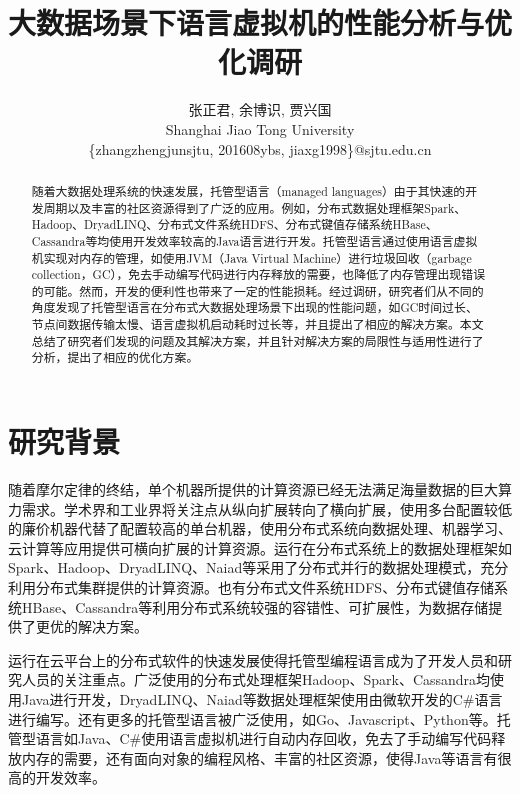 \documentclass[lang=cn,12pt,a4paper,cite=authoryear]{elegantpaper}
\title{大数据场景下语言虚拟机的性能分析与优化调研}
\author{张正君, 余博识, 贾兴国 \\ Shanghai Jiao Tong University \\ \{zhangzhengjunsjtu, 201608ybs, jiaxg1998\}@sjtu.edu.cn}
\institute{\href{http://www.se.sjtu.edu.cn/}{School of Software Engineering}}
\date{\zhtoday}
\begin{document}
\maketitle

\begin{abstract}
随着大数据处理系统的快速发展，托管型语言（managed languages）由于其快速的开发周期以及丰富的社区资源得到了广泛的应用。例如，分布式数据处理框架Spark、Hadoop、DryadLINQ、分布式文件系统HDFS、分布式键值存储系统HBase、Cassandra等均使用开发效率较高的Java语言进行开发。托管型语言通过使用语言虚拟机实现对内存的管理，如使用JVM（Java Virtual Machine）进行垃圾回收（garbage collection，GC），免去手动编写代码进行内存释放的需要，也降低了内存管理出现错误的可能。然而，开发的便利性也带来了一定的性能损耗。经过调研，研究者们从不同的角度发现了托管型语言在分布式大数据处理场景下出现的性能问题，如GC时间过长、节点间数据传输太慢、语言虚拟机启动耗时过长等，并且提出了相应的解决方案。本文总结了研究者们发现的问题及其解决方案，并且针对解决方案的局限性与适用性进行了分析，提出了相应的优化方案。
\end{abstract}

\cleardoublepage
\tableofcontents
\cleardoublepage

\section{研究背景}
随着摩尔定律的终结，单个机器所提供的计算资源已经无法满足海量数据的巨大算力需求。学术界和工业界将关注点从纵向扩展转向了横向扩展，使用多台配置较低的廉价机器代替了配置较高的单台机器，使用分布式系统向数据处理、机器学习、云计算等应用提供可横向扩展的计算资源。运行在分布式系统上的数据处理框架如Spark\cite{spark}、Hadoop\cite{hadoop}、DryadLINQ\cite{DBLP:conf/osdi/YuIFBEGC08}、Naiad\cite{DBLP:conf/sosp/MurrayMIIBA13}等采用了分布式并行的数据处理模式，充分利用分布式集群提供的计算资源。也有分布式文件系统HDFS\cite{hdfs}、分布式键值存储系统HBase\cite{hbase}、Cassandra\cite{cassandra}等利用分布式系统较强的容错性、可扩展性，为数据存储提供了更优的解决方案。

运行在云平台上的分布式软件的快速发展使得托管型编程语言成为了开发人员和研究人员的关注重点。广泛使用的分布式处理框架Hadoop、Spark、Cassandra均使用Java进行开发，DryadLINQ、Naiad等数据处理框架使用由微软开发的C\#语言进行编写。还有更多的托管型语言被广泛使用，如Go、Javascript、Python等。托管型语言如Java、C\#使用语言虚拟机进行自动内存回收，免去了手动编写代码释放内存的需要，还有面向对象的编程风格、丰富的社区资源，使得Java等语言有很高的开发效率。
\end{document}

